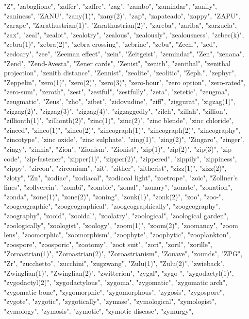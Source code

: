 "Z",
"zabaglione",
"zaffer",
"zaffre",
"zag",
"zambo",
"zamindar",
"zanily",
"zaniness",
"ZANU",
"zany(1)",
"zany(2)",
"zap",
"zapateado",
"zappy",
"ZAPU",
"zarape",
"Zarathustrian(1)",
"Zarathustrian(2)",
"zareba",
"zariba",
"zarzuela",
"zax",
"zeal",
"zealot",
"zealotry",
"zealous",
"zealously",
"zealousness",
"zebec(k)",
"zebra(1)",
"zebra(2)",
"zebra crossing",
"zebrine",
"zebu",
"Zech.",
"zed",
"zedoary",
"zee",
"Zeeman effect",
"zein",
"Zeitgeist",
"zemindar",
"Zen",
"zenana",
"Zend",
"Zend-Avesta",
"Zener cards",
"Zenist",
"zenith",
"zenithal",
"zenithal projection",
"zenith distance",
"Zennist",
"zeolite",
"zeolitic",
"Zeph.",
"zephyr",
"Zeppelin",
"zero(1)",
"zero(2)",
"zero(3)",
"zero-hour",
"zero option",
"zero-rated",
"zero-sum",
"zeroth",
"zest",
"zestful",
"zestfully",
"zeta",
"zetetic",
"zeugma",
"zeugmatic",
"Zeus",
"zho",
"zibet",
"zidovudine",
"ziff",
"ziggurat",
"zigzag(1)",
"zigzag(2)",
"zigzag(3)",
"zigzag(4)",
"zigzaggedly",
"zilch",
"zillah",
"zillion",
"zillionth(1)",
"zillionth(2)",
"zinc(1)",
"zinc(2)",
"zinc blende",
"zinc chloride",
"zinced",
"zinco(1)",
"zinco(2)",
"zincograph(1)",
"zincograph(2)",
"zincography",
"zincotype",
"zinc oxide",
"zinc sulphate",
"zing(1)",
"zing(2)",
"Zingaro",
"zinger",
"zingy",
"zinnia",
"Zion",
"Zionism",
"Zionist",
"zip(1)",
"zip(2)",
"zip(3)",
"zip-code",
"zip-fastener",
"zipper(1)",
"zipper(2)",
"zippered",
"zippily",
"zippiness",
"zippy",
"zircon",
"zirconium",
"zit",
"zither",
"zitherist",
"zizz(1)",
"zizz(2)",
"zloty",
"Zn",
"zodiac",
"zodiacal",
"zodiacal light",
"zoetrope",
"zoic",
"Zollner's lines",
"zollverein",
"zombi",
"zombie",
"zonal",
"zonary",
"zonate",
"zonation",
"zonda",
"zone(1)",
"zone(2)",
"zoning",
"zonk(1)",
"zonk(2)",
"zoo",
"zoo-",
"zoogeographic",
"zoogeographical",
"zoogeographically",
"zoogeography",
"zoography",
"zooid",
"zooidal",
"zoolatry",
"zoological",
"zoological garden",
"zoologically",
"zoologist",
"zoology",
"zoom(1)",
"zoom(2)",
"zoomancy",
"zoom lens",
"zoomorphic",
"zoomorphism",
"zoophyte",
"zoophytic",
"zooplankton",
"zoospore",
"zoosporic",
"zootomy",
"zoot suit",
"zori",
"zoril",
"zorille",
"Zoroastrian(1)",
"Zoroastrian(2)",
"Zoroastrianism",
"Zouave",
"zounds",
"ZPG",
"Zr",
"zucchetto",
"zucchini",
"zugzwang",
"Zulu(1)",
"Zulu(2)",
"zwieback",
"Zwinglian(1)",
"Zwinglian(2)",
"zwitterion",
"zygal",
"zygo-",
"zygodactyl(1)",
"zygodactyl(2)",
"zygodactylous",
"zygoma",
"zygomatic",
"zygomatic arch",
"zygomatic bone",
"zygomorphic",
"zygomorphous",
"zygosis",
"zygospore",
"zygote",
"zygotic",
"zygotically",
"zymase",
"zymological",
"zymologist",
"zymology",
"zymosis",
"zymotic",
"zymotic disease",
"zymurgy",
